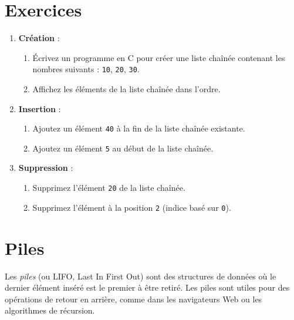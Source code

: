 \section*{Exercices}
\begin{enumerate}
	\item \textbf{Création} : 
	\begin{enumerate}
		\item Écrivez un programme en C pour créer une liste chaînée contenant les nombres suivants : \texttt{10}, \texttt{20}, \texttt{30}.
		\item Affichez les éléments de la liste chaînée dans l'ordre.
	\end{enumerate}
	
	\item \textbf{Insertion} : 
	\begin{enumerate}
		\item Ajoutez un élément \texttt{40} à la fin de la liste chaînée existante.
		\item Ajoutez un élément \texttt{5} au début de la liste chaînée.
	\end{enumerate}
	
	\item \textbf{Suppression} : 
	\begin{enumerate}
		\item Supprimez l'élément \texttt{20} de la liste chaînée.
		\item Supprimez l'élément à la position \texttt{2} (indice basé sur \texttt{0}).
	\end{enumerate}
	
\end{enumerate}


\section{Piles}

Les \emph{piles} (ou LIFO, Last In First Out) sont des structures de données où le dernier élément inséré est le premier à être retiré. Les piles sont utiles pour des opérations de retour en arrière, comme dans les navigateurs Web ou les algorithmes de récursion.

